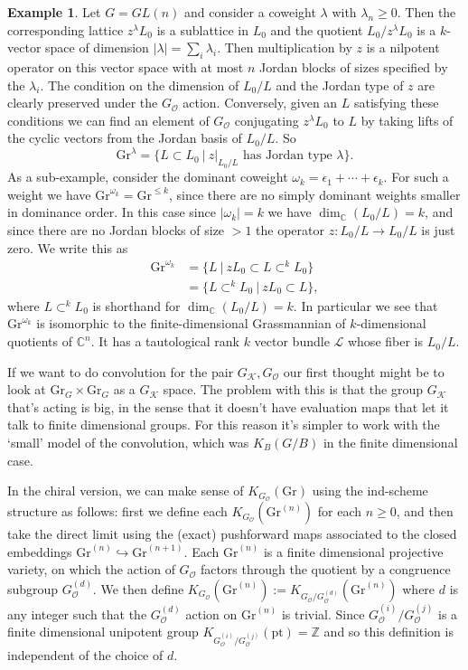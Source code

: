 \documentclass[11pt]{amsart}
\theoremstyle{definition}
\newtheorem{example}[dummy]{Example}
\newcommand{\bC}{\mathbb{C}}
\newcommand{\Kc}{\mathcal{K}}
\newcommand{\bZ}{\mathbb{Z}}
\newcommand{\Gr}{\mathrm{Gr}}
\newcommand{\Oc}{\mathcal{O}}
\newcommand{\eps}{{\epsilon}}
\numberwithin{equation}{subsection}
\numberwithin{figure}{subsection}
\newcommand{\pt}{\mathrm{pt}}
\begin{document}
\begin{example}
Let $G=GL(n)$ and consider a coweight $\lambda$ with $\lambda_n\geq0$. Then the corresponding lattice $z^\lambda L_0$ is a sublattice in $L_0$ and the quotient $L_0/z^\lambda L_0$ is a $k$-vector space of dimension $|\lambda| = \sum_i\lambda_i$. Then multiplication by $z$ is a nilpotent operator on this vector space with at most $n$ Jordan blocks of sizes specified by the $\lambda_i$. The condition on the dimension of $L_0/L$ and the Jordan type of $z$ are clearly preserved under the $G_\Oc$ action. Conversely, given an $L$ satisfying these conditions we can find an element of $G_\Oc$ conjugating $z^\lambda L_0$ to $L$  by taking lifts of the cyclic vectors from the Jordan basis of $L_0/L$. So 
$$
\Gr^{\lambda}= \{L\subset L_0 ~\big|~ z|_{L_0/L} \text{ has Jordan type } \lambda \}.
$$
As a sub-example, consider the dominant coweight $\omega_k=\eps_1+\cdots+\eps_k$. For such a weight we have $\Gr^{\omega_k}=\Gr^{\leq k}$, since there are no simply dominant weights smaller in dominance order. In this case since $|\omega_k|=k$ we have $\dim_\bC(L_0/L)=k$, and since there are no Jordan blocks of size $>1$ the operator $z:L_0/L\rightarrow L_0/L$ is just zero. We write this as 
\begin{align*}
\Gr^{\omega_k} &= \{L~\big|~ zL_0\subset L\subset^k L_0 \}\\
&= \{ L\subset^k L_0 ~\big|~ zL_0\subset L\},
\end{align*}
where $L\subset^kL_0$ is shorthand for $\dim_\bC(L_0/L)=k$. In particular we see that $\Gr^{\omega_k}$ is isomorphic to the finite-dimensional Grassmannian of $k$-dimensional quotients of $\bC^n$. It has a tautological rank $k$ vector bundle $\mathcal{L}$ whose fiber is $L_0/L$.
\end{example}



If we want to do convolution for the pair $G_{\Kc},G_\Oc$ our first thought might be to look at $\Gr_G\times \Gr_G$ as a $G_\Kc$ space. The problem with this is that the group $G_\Kc$ that's acting is big, in the sense that it doesn't have evaluation maps that let it talk to finite dimensional groups.  For this reason it's simpler to work with the `small' model of the convolution, which was $K_B(G/B)$ in the finite dimensional case. 

In the chiral version, we can make sense of $K_{G_\Oc}(\Gr)$ using the ind-scheme structure as follows: first we define each $K_{G_\Oc}(\Gr^{(n)})$ for each $n\geq0$, and then take the direct limit using the (exact) pushforward maps associated to the closed embeddings $\Gr^{(n)}\hookrightarrow\Gr^{(n+1)}$. Each $\Gr^{(n)}$ is a finite dimensional projective variety, on which the action of $G_\Oc$ factors through the quotient by a congruence subgroup $G^{(d)}_\Oc$. We then define $K_{G_\Oc}(\Gr^{(n)}):=K_{G_\Oc/G_\Oc^{(d)}}(\Gr^{(n)})$ where $d$ is any integer such that the $G_\Oc^{(d)}$ action on $\Gr^{(n)}$ is trivial. Since $G_\Oc^{(i)}/G_\Oc^{(j)}$ is a finite dimensional unipotent group $K_{G_\Oc^{(i)}/G_\Oc^{(j)}}(\pt)=\bZ$ and so this definition is independent of the choice of $d$.
\end{document}

